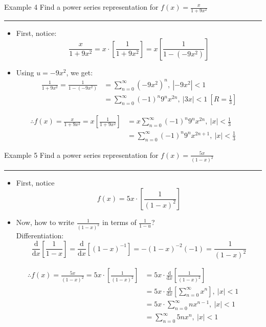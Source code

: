 \documentclass[12pt,a4paper]{article}
\def\d{{\mathrm{d}}}
\def\dx{\d x}
\begin{document}
\begin{eg}{Example 4}
	Find a power series representation for $\displaystyle f(x)=\frac{x}{1+9x^2}$\\
	\noindent\rule[0.25\baselineskip]{\textwidth}{1pt}
	\begin{itemize}
		\item First, notice: $$\frac{x}{1+9x^2}=x\cdot\left[\frac{1}{1+9x^2}\right]=x\left[\frac{1}{1-(-9x^2)}\right]$$
		\item Using $u=-9x^2$, we get: 
			$$\begin{aligned}
				\frac{1}{1+9x^2}=\frac{1}{1-(-9x^2)}&=\sum^\infty_{n=0}(-9x^2)^n,\ |-9x^2|<1\\
				&=\sum^\infty_{n=0}(-1)^n9^nx^{2n},\ |3x|<1\ \left[R=\frac{1}{3}\right]
			\end{aligned}$$
	\end{itemize}
	$$\begin{aligned}
		\therefore f(x)=\frac{x}{1+9x^2}=x\left[\frac{1}{1+9x^2}\right]&=x\sum^\infty_{n=0}(-1)^n9^nx^{2n},\ |x|<\frac{1}{3}\\
		&=\sum^\infty_{n=0}(-1)^n9^nx^{2n+1},\ |x|<\frac{1}{3}
	\end{aligned}$$
\end{eg}
\begin{eg}{Example 5}
	Find a power series representation for $\displaystyle f(x)=\frac{5x}{(1-x)^2}$\\
	\noindent\rule[0.25\baselineskip]{\textwidth}{1pt}
	\begin{itemize}
		\item First, notice $$f(x)=5x\cdot\left[\frac{1}{(1-x)^2}\right]$$
		\item Now, how to write $\displaystyle\frac{1}{(1-x)^2}$ in terms of $\displaystyle\frac{1}{1-u}$? \\
		Differentiation: $$\frac{\d}{\dx}\left[\frac{1}{1-x}\right]=\frac{\d}{\dx}\left[(1-x)^{-1}\right]=-(1-x)^{-2}(-1)=\frac{1}{(1-x)^2}$$
	\end{itemize}
	$$\begin{aligned}
		\therefore f(x)=\frac{5x}{(1-x)^2}=5x\cdot\left[\frac{1}{(1-x)^2}\right]&=5x\cdot\frac{\d}{\d x}\left[\frac{1}{(1-x)^2}\right]\\
		&=5x\cdot\frac{\d}{\d x}\left[\sum^\infty_{n=0}x^n\right],\ |x|<1\\
		&=5x\cdot\sum^\infty_{n=0}nx^{n-1},\ |x|<1\\
		&=\sum^\infty_{n=0}5nx^n,\ |x|<1
	\end{aligned}$$
\end{eg}
\end{document}
